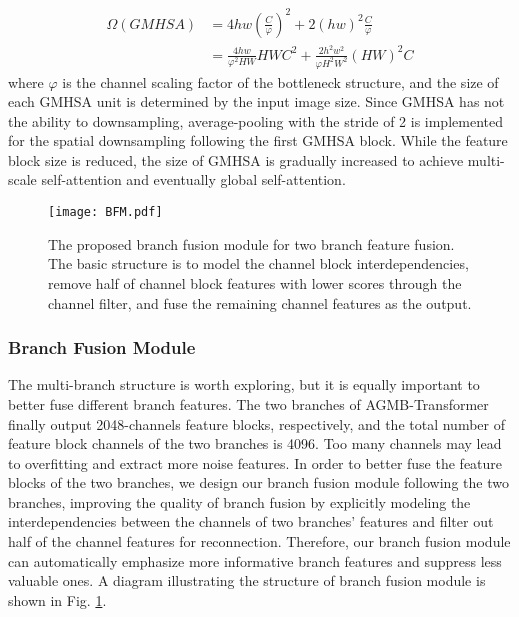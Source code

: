 \documentclass[journal]{IEEEtran}
\begin{document}
\begin{equation}
\begin{aligned}
\Omega(GMHSA) &= 4hw(\frac{C}{\varphi})^2 + 2(hw)^2\frac{C}{\varphi} \\
&=\frac{4hw}{\varphi^2HW}HWC^2 + \frac{2h^2w^2}{\varphi H^2W^2}(HW)^2C
\end{aligned}
\label{f5}
\end{equation}
where $\varphi$ is the channel scaling factor of the bottleneck structure, and the size of each GMHSA unit is determined by the input image size. Since GMHSA has not the ability to downsampling, average-pooling with the stride of 2 is implemented for the spatial downsampling following the first GMHSA block. While the feature block size is reduced, the size of GMHSA is gradually increased to achieve multi-scale self-attention and eventually global self-attention.

\begin{figure}[ht]
  \centering
  \texttt{[image: BFM.pdf]}
  \caption{The proposed branch fusion module for two branch feature fusion. The basic structure is to model the channel block interdependencies, remove half of channel block features with lower scores through the channel filter, and fuse the remaining channel features as the output.}
  \label{fig:BFM}
\end{figure}

\subsubsection{Branch Fusion Module}
The multi-branch structure is worth exploring, but it is equally important to better fuse different branch features. The two branches of AGMB-Transformer finally output 2048-channels feature blocks, respectively, and the total number of feature block channels of the two branches is 4096. Too many channels may lead to overfitting and extract more noise features. In order to better fuse the feature blocks of the two branches, we design our branch fusion module following the two branches, improving the quality of branch fusion by explicitly modeling the interdependencies between the channels of two branches' features and filter out half of the channel features for reconnection. Therefore, our branch fusion module can automatically emphasize more informative branch features and suppress less valuable ones. A diagram illustrating the structure of branch fusion module is shown in \textcolor[rgb]{0,0.541,0.855}{Fig. \ref{fig:BFM}}.
\end{document}
